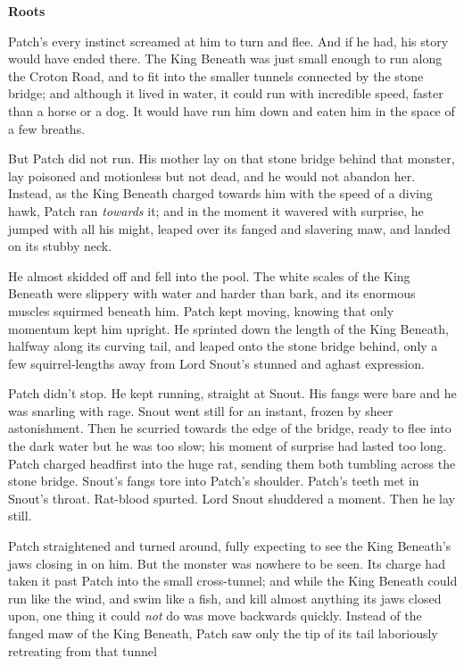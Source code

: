 \documentclass[11pt]{article}
\begin{document}
\par
{\bf Roots\par
}\par
 Patch's every instinct screamed at him to turn and flee. And if he had, his story would have ended there. The King Beneath was just small enough to run along the Croton Road, and to fit into the smaller tunnels connected by the stone bridge; and although it lived in water, it could run with incredible speed, faster than a horse or a dog. It would have run him down and eaten him in the space of a few breaths.\par
 But Patch did not run. His mother lay on that stone bridge behind that monster, lay poisoned and motionless but not dead, and he would not abandon her. Instead, as the King Beneath charged towards him with the speed of a diving hawk, Patch ran {\it towards} it; and in the moment it wavered with surprise, he jumped with all his might, leaped over its fanged and slavering maw, and landed on its stubby neck.\par
 He almost skidded off and fell into the pool. The white scales of the King Beneath were slippery with water and harder than bark, and its enormous muscles squirmed beneath him. Patch kept moving, knowing that only momentum kept him upright. He sprinted down the length of the King Beneath, halfway along its curving tail, and leaped onto the stone bridge behind, only a few squirrel-lengths away from Lord Snout's stunned and aghast expression.\par
Patch didn't stop. He kept running, straight at Snout. His fangs were bare and he was snarling with rage. Snout went still for an instant, frozen by sheer astonishment. Then he scurried towards the edge of the bridge, ready to flee into the dark water %
 but he was too slow; his moment of surprise had lasted too long. Patch charged headfirst into the huge rat, sending them both tumbling across the stone bridge. Snout's fangs tore into Patch's shoulder. Patch's teeth met in Snout's throat. Rat-blood spurted. Lord Snout shuddered a moment. Then he lay still.\par
Patch straightened and turned around, fully expecting to see the King Beneath's jaws closing in on him. But the monster was nowhere to be seen. Its charge had taken it past Patch into the small cross-tunnel; and while the King Beneath could run like the wind, and swim like a fish, and kill almost anything its jaws closed upon, one thing it could {\it not} do was move backwards quickly. Instead of the fanged maw of the King Beneath, Patch saw only the tip of its tail laboriously retreating from that tunnel %
\end{document}
